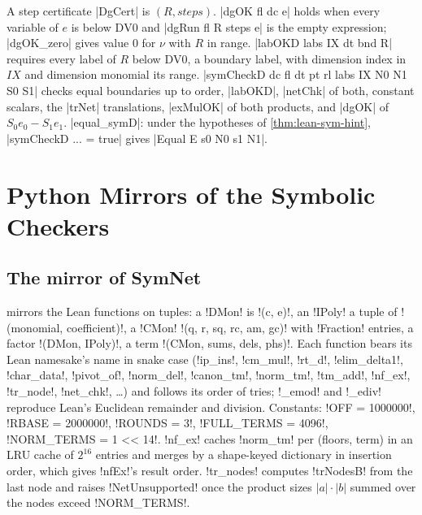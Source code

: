 \begin{theorem}\label{thm:lean-sym-equal-symD}
A step certificate \lean|DgCert| is $(R,\mathit{steps})$. \lean|dgOK fl dc e| holds when every variable of $e$ is below $\mathrm{DV0}$ and \lean|dgRun fl R steps e| is the empty expression; \lean|dgOK_zero| gives value $0$ for $\nu$ with $R$ in range. \lean|labOKD labs IX dt bnd R| requires every label of $R$ below $\mathrm{DV0}$, a boundary label, with dimension index in $IX$ and dimension monomial its range. \lean|symCheckD dc fl dt pt rl labs IX N0 N1 S0 S1| checks equal boundaries up to order, \lean|labOKD|, \lean|netChk| of both, constant scalars, the \lean|trNet| translations, \lean|exMulOK| of both products, and \lean|dgOK| of $S_0e_0-S_1e_1$. \lean|equal_symD|: under the hypotheses of \cref{thm:lean-sym-hint}, \lean|symCheckD ... = true| gives \lean|Equal E s0 N0 s1 N1|.
\end{theorem}

\section{Python Mirrors of the Symbolic Checkers}\label{sec:lean-sym-py-sym}

\subsection{The mirror of SymNet}

 mirrors the Lean functions on tuples: a \lean!DMon! is \py!(c, e)!, an \lean!IPoly! a tuple of \py!(monomial, coefficient)!, a \lean!CMon! \py!(q, r, sq, rc, am, gc)! with \py!Fraction! entries, a factor \py!(DMon, IPoly)!, a term \py!(CMon, sums, dels, phs)!. Each function bears its Lean namesake's name in snake case (\py!ip_ins!, \py!cm_mul!, \py!rt_d!, \py!elim_delta1!, \py!char_data!, \py!pivot_of!, \py!norm_del!, \py!canon_tm!, \py!norm_tm!, \py!tm_add!, \py!nf_ex!, \py!tr_node!, \py!net_chk!, \ldots) and follows its order of tries; \py!_emod! and \py!_ediv! reproduce Lean's Euclidean remainder and division. Constants: \py!OFF = 1000000!, \py!RBASE = 2000000!, \py!ROUNDS = 3!, \py!FULL_TERMS = 4096!, \py!NORM_TERMS = 1 << 14!. \py!nf_ex! caches \py!norm_tm! per (floors, term) in an LRU cache of $2^{16}$ entries and merges by a shape-keyed dictionary in insertion order, which gives \lean!nfEx!'s result order. \py!tr_nodes! computes \lean!trNodesB! from the last node and raises \py!NetUnsupported! once the product sizes $|a|\cdot|b|$ summed over the nodes exceed \py!NORM_TERMS!.

